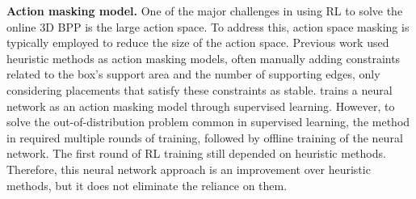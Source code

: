 \textbf{Action masking model.}
One of the major challenges in using RL to solve the online 3D BPP is the large action space. To address this, action space masking is typically employed to reduce the size of the action space. Previous work \cite{zhao2021online} used heuristic methods as action masking models, often manually adding constraints related to the box's support area and the number of supporting edges, only considering placements that satisfy these constraints as stable. \cite{wu2024efficient} trains a neural network as an action masking model through supervised learning. However, to solve the out-of-distribution problem common in supervised learning, the method in \cite{wu2024efficient} required multiple rounds of training, followed by offline training of the neural network. The first round of RL training still depended on heuristic methods. Therefore, this neural network approach is an improvement over heuristic methods, but it does not eliminate the reliance on them.